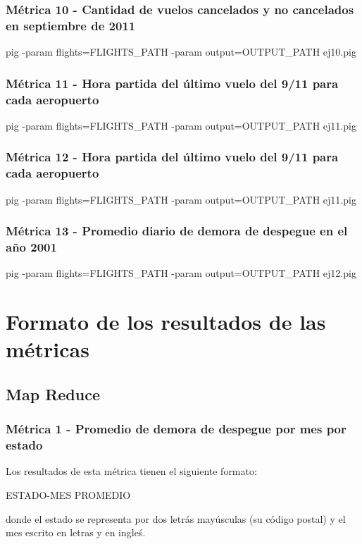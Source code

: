 \documentclass[a4paper,10pt]{article}
\begin{document}
        \subsubsection{Métrica 10 - Cantidad de vuelos cancelados y no cancelados en septiembre de 2011}
            \footnotesize{pig -param flights=FLIGHTS\_PATH -param output=OUTPUT\_PATH ej10.pig}
        \subsubsection{Métrica 11 - Hora partida del último vuelo del 9/11 para cada aeropuerto}
            \footnotesize{pig -param flights=FLIGHTS\_PATH -param output=OUTPUT\_PATH ej11.pig}
        \subsubsection{Métrica 12 - Hora partida del último vuelo del 9/11 para cada aeropuerto}
            \footnotesize{pig -param flights=FLIGHTS\_PATH -param output=OUTPUT\_PATH ej11.pig}
        \subsubsection{Métrica 13 - Promedio diario de demora de despegue en el año 2001 }
            \footnotesize{pig -param flights=FLIGHTS\_PATH -param output=OUTPUT\_PATH ej12.pig}

\small
\section{Formato de los resultados de las métricas}

    \subsection{Map Reduce}
        \subsubsection{Métrica 1 - Promedio de demora de despegue por mes por estado}
            Los resultados de esta métrica tienen el siguiente formato:\\
            \begin{center}
                ESTADO-MES PROMEDIO \\
            \end{center}
            donde el estado se representa por dos letrás mayúsculas (su código postal) y el mes escrito en letras y en ingleś.
\end{document}
